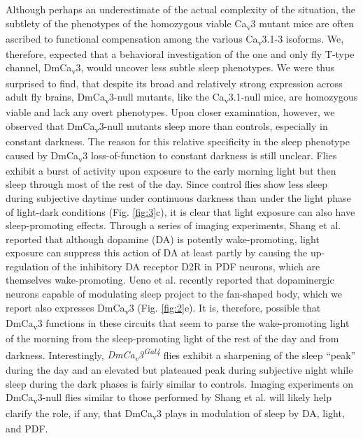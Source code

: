 Although perhaps an underestimate of the actual complexity of the situation, the subtlety of the phenotypes of the homozygous viable Ca\textsubscript{v}3 mutant mice are often ascribed to functional compensation among the various Ca\textsubscript{v}3.1-3 isoforms\cite{senatore:2012aa}.
We, therefore, expected that a behavioral investigation of the one and only fly T-type channel, DmCa\textsubscript{v}3, would uncover less subtle sleep phenotypes.
We were thus surprised to find, that despite its broad and relatively strong expression across adult fly brains, DmCa\textsubscript{v}3-null mutants, like the Ca\textsubscript{v}3.1-null mice, are homozygous viable and lack any overt phenotypes.
Upon closer examination, however, we observed that DmCa\textsubscript{v}3-null mutants sleep more than controls, especially in constant darkness.
The reason for this relative specificity in the sleep phenotype caused by DmCa\textsubscript{v}3 loss-of-function to constant darkness is still unclear.
Flies exhibit a burst of activity upon exposure to the early morning light but then sleep through most of the rest of the day.
Since control flies show less sleep during subjective daytime under continuous darkness than under the light phase of light-dark conditions (Fig. \ref{fig:3}c), it is clear that light exposure can also have sleep-promoting effects.
Through a series of imaging experiments, Shang et al. reported that although dopamine (DA) is potently wake-promoting, light exposure can suppress this action of DA at least partly by causing the up-regulation of the inhibitory DA receptor D2R in PDF neurons, which are themselves wake-promoting\cite{Shang:2011aa}.
Ueno et al. recently reported that dopaminergic neurons capable of modulating sleep project to the fan-shaped body\cite{Ueno:2012aa}, which we report also expresses DmCa\textsubscript{v}3 (Fig. \ref{fig:2}e).
It is, therefore, possible that DmCa\textsubscript{v}3 functions in these circuits that seem to parse the wake-promoting light of the morning from the sleep-promoting light of the rest of the day and from darkness.
Interestingly, \emph{DmCa\textsubscript{v}3\textsuperscript{Gal4}} flies exhibit a sharpening of the sleep ``peak'' during the day and an elevated but plateaued peak during subjective night while sleep during the dark phases is fairly similar to controls.
Imaging experiments on DmCa\textsubscript{v}3-null flies similar to those performed by Shang et al. will likely help clarify the role, if any, that DmCa\textsubscript{v}3 plays in modulation of sleep by DA, light, and PDF. 

